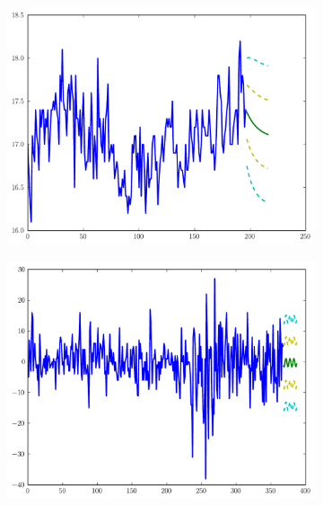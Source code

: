 \begin{figure}
	\centering
       \begin{subfigure}[b]{0.7\textwidth}
                \includegraphics[width=\textwidth]{forecasted_a}
        \end{subfigure}%

        \begin{subfigure}[b]{0.7\textwidth}
                \includegraphics[width=\textwidth]{forecasted_b}
        \end{subfigure}


\end{figure}
